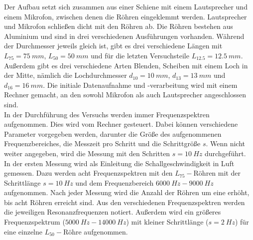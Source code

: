 %
Der Aufbau setzt sich zusammen aus einer Schiene mit einem Lautsprecher und einem Mikrofon, zwischen denen die Röhren eingeklemmt werden.
Lautsprecher und Mikrofon schließen dicht mit den Röhren ab.
Die Röhren bestehen aus Aluminium und sind in drei verschiedenen Ausführungen vorhanden.
Während der Durchmesser jeweils gleich ist, gibt es drei verschiedene Längen mit $L_{75} = \SI{75}{mm}$, $L_{50} = \SI{50}{mm}$ und für die letzten Versuchsteile $L_{12.5} = \SI{12.5}{mm}$.
Außerdem gibt es drei verschiedene Arten Blenden, Scheiben mit einem Loch in der Mitte, nämlich die Lochdurchmesser $d_{10} = \SI{10}{mm}$, $d_{13} = \SI{13}{mm}$ und $d_{16} = \SI{16}{mm}$.
Die initiale Datenaufnahme und -verarbeitung wird mit einem Rechner gemacht, an den sowohl Mikrofon als auch Lautsprecher angeschlossen sind.\\
%
In der Durchführung des Versuchs werden immer Frequenzspektren aufgenommen.
Dies wird vom Rechner gesteuert.
Dabei können verschiedene Parameter vorgegeben werden, darunter die Größe des aufgenommenen Frequenzbereiches, die Messzeit pro Schritt und die Schrittgröße $s$.
Wenn nicht weiter angegeben, wird die Messung mit den Schritten $s = \SI{10}{Hz}$ durchgeführt.\\
%
%
In der ersten Messung wird als Einleitung die Schallgeschwindigkeit in Luft gemessen.
Dazu werden acht Frequenzspektren mit den $L_{75}-$Röhren mit der Schrittlänge $ s= \SI{10}{Hz}$ und dem Frequenzbereich $\SI{6000}{Hz} - \SI{9000}{Hz}$ aufgenommen.
Nach jeder Messung wird die Anzahl der Röhren um eine erhöht, bis acht Röhren erreicht sind.
Aus den verschiedenen Frequenzspektren werden die jeweiligen Resonanzfrequenzen notiert.
Außerdem wird ein größeres Frequenzspektrum ($\SI{5000}{Hz}-\SI{14000}{Hz}$) mit kleiner Schrittlänge ($s = \SI{2}{Hz}$) für eine einzelne $L_{50}-$Röhre aufgenommen.\\
